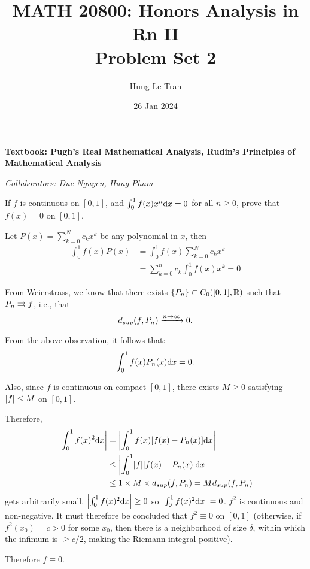 \documentclass[a4paper, 12pt]{article}
\title{MATH 20800: Honors Analysis in Rn II \\ \large Problem Set 2}
\date{26 Jan 2024}
\author{Hung Le Tran}
\begin{document}
\maketitle
\setcounter{section}{3}
\textbf{Textbook: Pugh's Real Mathematical Analysis, Rudin's Principles of Mathematical Analysis}

\textit{Collaborators: Duc Nguyen, Hung Pham}
\begin{problem} 
    If $f$ is continuous on $[0, 1]$, and $\int_{0}^{1} f(x) x^n \dx = 0$ for all $n \geq 0$, prove that $f(x) = 0$ on $[0, 1]$.
\end{problem}
\begin{solution}
    Let $P(x) = \sum_{k=0}^{N} c_kx^k$ be any polynomial in $x$, then
    \begin{align*}
        \int_{0}^{1} f(x) P(x) &= \int_{0}^{1} f(x) \sum_{k=0}^{N} c_k x^k\\
        &= \sum_{k=0}^{n} c_k \int_{0}^1 f(x) x^k = 0
    \end{align*}

    From Weierstrass, we know that there exists $\{P_n\} \subset C_0([0, 1], \bbr)$ such that $P_n \unicvg f$, i.e., that \begin{equation*}
    d_{sup}(f, P_n) \cvgn 0.
    \end{equation*}
    
    From the above observation, it follows that: \begin{equation*}
    \int_{0}^{1} f(x) P_n(x) \dx = 0.
    \end{equation*}

    Also, since $f$ is continuous on compact $[0, 1]$, there exists $M \geq 0$ satisfying $\abs{f} \leq M$ on $[0, 1]$.
    
    Therefore, \begin{align*}
        \abs*{\int_{0}^{1} f(x)^2 \dx} &= \abs*{\int_{0}^{1} f(x)[f(x) - P_n(x)] \dx} \\
        &\leq \abs*{\int_{0}^{1} \abs{f} \abs{f(x) - P_n(x)} \dx} \\
        &\leq 1 \times M \times d_{sup}(f, P_n) = M d_{sup}(f, P_n)
    \end{align*}
    gets arbitrarily small. $\abs*{\int_{0}^{1} f(x)^2 \dx}  \geq 0$ so $\abs*{\int_{0}^{1} f(x)^2 \dx}  = 0$. $f^2$ is continuous and non-negative. It must therefore be concluded that $f^2 \equiv 0$ on $[0, 1]$ (otherwise, if $f^2(x_0) = c > 0$ for some $x_0$, then there is a neighborhood of size $\delta$, within which the infimum is $\geq c/2$, making the Riemann integral positive).

    Therefore $f \equiv 0$.
\end{solution}
\end{document}
